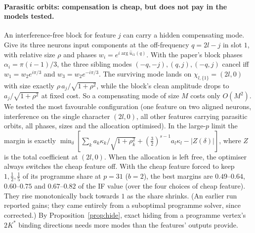 \documentclass[11pt]{article}
\theoremstyle{definition}
\begin{document}
\paragraph{Parasitic orbits: compensation is cheap, but does not pay in the models tested.}  An interference-free block
for feature $j$ can carry a hidden compensating mode.  Give its three neurons input components at the off-frequency
$q=2l-j$ in slot $1$, with relative size $\rho$ and phases $w_i=e^{i\arg\hat u_{i1}(q)}$.  With the paper's block phases
$\alpha_i=\pi(i-1)/3$, the three sibling modes $(-q,-j),(q,j),(-q,j)$ cancel iff $w_1=w_2e^{i\pi/3}$ and $w_3=w_2e^{-i\pi/3}$.  The surviving
mode lands on $\chi_{l,\{1\}}=(2l,0)$ with size exactly $\rho\,a_j/\sqrt{1+\rho^2}$, while the block's clean amplitude drops to
$a_j/\sqrt{1+\rho^2}$ at fixed cost.  So a compensating mode of size $M$ costs only $O(M^2)$.  We tested the most favourable
configuration (one feature on two aligned neurons, interference on the single character $(2l,0)$, all other features
carrying parasitic orbits, all phases, sizes and the allocation optimised).  In the large-$p$ limit the margin is
exactly $\min_\delta[\sum_ka_k\kappa_k/\sqrt{1+\rho_k^2}+(\tfrac32)^{s-1}a_l\kappa_l-|Z(\delta)|]$, where $Z$ is the total coefficient at
$(2l,0)$.  When the allocation is left free, the optimiser always switches the cheap feature off.  With the cheap feature forced to
keep $1,\frac12,\frac15$ of its programme share at $p=31$ ($b=2$), the best margins are $0.49$--$0.64$, $0.60$--$0.75$ and $0.67$--$0.82$ of the IF value
(over the four choices of cheap feature).  They rise monotonically back towards $1$ as the share shrinks.  (An earlier run reported gains; they came entirely
from a suboptimal programme solver, since corrected.)  By Proposition~\ref{prop:hide}, exact hiding from a programme vertex's
$2K^*$ binding directions needs more modes than the features' outputs provide.
\end{document}
